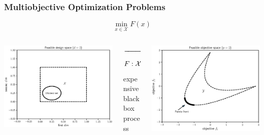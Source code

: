\documentclass[aspectratio=169]{beamer}
\begin{document}
\begin{frame}\frametitle{Multiobjective Optimization Problems}
\begin{center}
{\Large
$$
\min_{x \in \mathcal{X}} F(x)
$$
}%
\end{center}
\begin{columns}
\begin{column}{.35\textwidth}
\includegraphics[width=\textwidth]{feasible_design.eps}
\end{column}
\begin{column}{.2\textwidth}
\begin{center}
$\xrightarrow{\hspace*{2cm}}$
$$
F : {\cal X} \rightarrow {\cal Y}
$$
expensive blackbox process
\end{center}
\end{column}
\begin{column}{.35\textwidth}
\includegraphics[width=\textwidth]{convex_pareto.eps}
\end{column}
\end{columns}
\end{frame}
\end{document}
